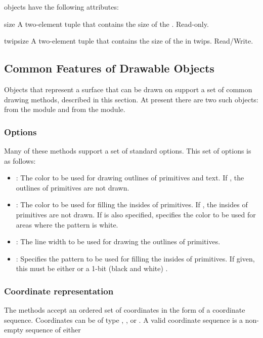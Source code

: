  objects have the following attributes:

\begin{memberdesc}[Image]{size}
A two-element tuple that contains the size of the . Read-only.
\end{memberdesc}

\begin{memberdesc}[Image]{twipsize}
A two-element tuple that contains the size of the  in twips. Read/Write.
\end{memberdesc}

\subsection{Common Features of Drawable Objects}
\label{subsec:common}
Objects that represent a surface that can be drawn on support a set of 
common drawing methods, described in this section. At present there are two 
such objects:  from the  module and 
 from the  module. 

\subsubsection{Options}
\label{subsubsec:options}
Many of these methods support a set of standard options. This set of options 
is as follows:

\begin{itemize}
\item {}: The color to be used for drawing outlines of primitives and text. If , the outlines of primitives are not drawn.
\item {}: The color to be used for filling the insides of primitives. If , the insides of primitives are not drawn. If  is also specified,  specifies the color to be used for areas where the pattern is white.
\item {}: The line width to be used for drawing the outlines of primitives.
\item {}: Specifies the pattern to be used for filling the insides of primitives. If given, this must be either  or a 1-bit (black and white) .
\end{itemize}

\subsubsection{Coordinate representation}
\label{subsubsec:coordinate}
The methods accept an ordered set of coordinates in the form of a coordinate 
sequence. Coordinates can be of type , , or 
. A valid coordinate sequence is a non-empty sequence of 
either

